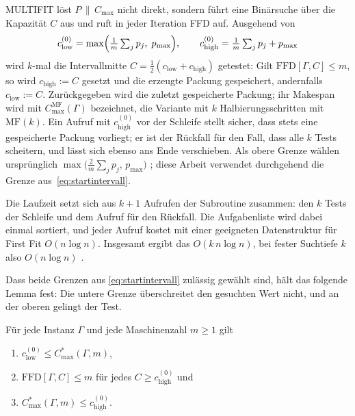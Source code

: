 MULTIFIT \cite{coffman1978} löst $P\,\|\,C_{\max}$ nicht direkt, sondern führt eine Binärsuche über
die Kapazität $C$ aus und ruft in jeder Iteration FFD auf.
Ausgehend von
\begin{equation}
  c_{\mathrm{low}}^{(0)} = \max\Bigl( \tfrac{1}{m}\textstyle\sum_j p_j,\; p_{\max} \Bigr),
  \qquad
  c_{\mathrm{high}}^{(0)} = \tfrac{1}{m}\textstyle\sum_j p_j + p_{\max}
  \label{eq:startintervall}
\end{equation}
wird $k$-mal die Intervallmitte $C = \frac{1}{2}(c_{\mathrm{low}} + c_{\mathrm{high}})$ getestet:
Gilt $\mathrm{FFD}[\Gamma, C] \le m$, so wird $c_{\mathrm{high}} := C$ gesetzt und die erzeugte
Packung gespeichert, andernfalls $c_{\mathrm{low}} := C$.
Zurückgegeben wird die zuletzt gespeicherte Packung; ihr Makespan wird mit
$C^{\mathrm{MF}}_{\max}(\Gamma)$ bezeichnet, die Variante mit $k$ Halbierungsschritten mit
$\mathrm{MF}(k)$.
Ein Aufruf mit $c_{\mathrm{high}}^{(0)}$ vor der Schleife stellt sicher, dass stets eine
gespeicherte Packung vorliegt; er ist der Rückfall für den Fall, dass alle $k$ Tests scheitern,
und lässt sich ebenso ans Ende verschieben.
Als obere Grenze wählen \textcite{coffman1978} ursprünglich
$\max\bigl(\tfrac{2}{m}\sum_j p_j,\, p_{\max}\bigr)$ \cite[S.~37]{friesen_langston1986}; diese
Arbeit verwendet durchgehend die Grenze aus~\eqref{eq:startintervall}.

Die Laufzeit setzt sich aus $k+1$ Aufrufen der Subroutine zusammen: den $k$ Tests der Schleife
und dem Aufruf für den Rückfall.
Die Aufgabenliste wird dabei einmal sortiert, und jeder Aufruf kostet mit einer geeigneten
Datenstruktur für First Fit $O(n \log n)$.
Insgesamt ergibt das $O(k\,n \log n)$, bei fester Suchtiefe $k$ also $O(n \log n)$
\cite[S.~35]{friesen_langston1986}.

Dass beide Grenzen aus \eqref{eq:startintervall} zulässig gewählt sind, hält das folgende Lemma
fest: Die untere Grenze überschreitet den gesuchten Wert nicht, und an der oberen gelingt der
Test.

\begin{lemma}[Startintervall]
\label{lem:startintervall}
Für jede Instanz $\Gamma$ und jede Maschinenzahl $m \ge 1$ gilt
\begin{enumerate}[label=(\alph*), nosep]
  \item $c_{\mathrm{low}}^{(0)} \le C^{*}_{\max}(\Gamma, m)$,
  \item $\mathrm{FFD}[\Gamma, C] \le m$ für jedes $C \ge c_{\mathrm{high}}^{(0)}$ und
  \item $C^{*}_{\max}(\Gamma, m) \le c_{\mathrm{high}}^{(0)}$.
\end{enumerate}
\end{lemma}


